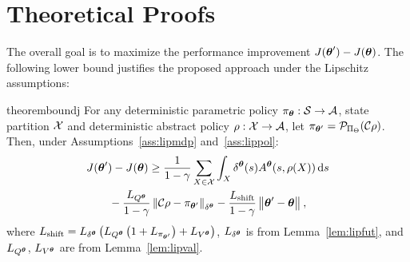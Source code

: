 \chapter{Theoretical Proofs} \label{ch:proofs}

The overall goal is to maximize the performance improvement $J(\vtheta') - J(\vtheta)$.
The following lower bound
justifies the proposed approach under the Lipschitz assumptions:
%
\begin{restatable}{theorem}{boundj}\label{lem:boundj}
	For any deterministic parametric policy ${\pi_{\vtheta}:\Sspace\to\Aspace}$, state partition $\Xspace$ and deterministic abstract policy ${\rho:\Xspace\to\Aspace}$, let $\pi_{\vtheta'} = \Proj_{\Pi_{\Theta}}(\Conc\rho)$. Then, under Assumptions~\ref{ass:lipmdp} and~\ref{ass:lippol}:
	\begin{align*}
	&J(\vtheta') - J(\vtheta) \geq \frac{1}{1-\gamma}\sum_{X\in\Xspace}\int_{X}\delta^{\vtheta}(s)A^{\vtheta}(s,\rho(X)) \de s 
	\nonumber\\&\qquad- \frac{L_{Q^{\vtheta}}}{1-\gamma}\norm[\delta^{\vtheta}]{\Conc\rho - \pi_{\vtheta'}} 
	-\frac{L_{\text{shift}}}{1-\gamma} \norm{\vtheta'-\vtheta},
	\end{align*}
	where $L_{\text{shift}}=L_{\delta^{\vtheta}}\left(L_{Q^{\vtheta}}\left(1+L_{\pi_{\vtheta'}}\right)+L_{V^{\vtheta}}\right)$, $L_{\delta^{\vtheta}}$ is from Lemma~\ref{lem:lipfut}, and $L_{Q^{\vtheta}}$, $L_{V^{\vtheta}}$ are from Lemma~\ref{lem:lipval}. 
\end{restatable}

